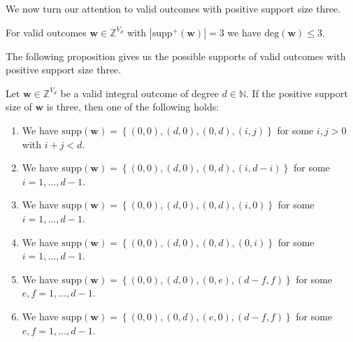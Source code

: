 We now turn our attention to valid outcomes with positive support size three.

\begin{theorem}\label{thm:sfnjksnfjkwenjfk}
    For valid outcomes \( \mathbf w \in \mathbb{Z}^{V_d}  \) with \( |\mathrm{supp}^+(\mathbf w)| = 3 \) we have \( \mathrm{deg}(\mathbf w) \leq 3 \).
\end{theorem}

The following proposition gives us the possible supports of valid outcomes with positive support size three.

\begin{proposition}\label{lemma:wmrkwjnr3w}
    Let \( \mathbf{w} \in \mathbb{Z}^{V_d} \) be a valid integral outcome of degree \( d \in \mathbb{N} \). If the positive support size of \( \mathbf{w} \) is three, then one of the following holds:
    \begin{enumerate}
        \item We have \( \mathrm{supp}(\mathbf{w}) = \left\{ (0,0), (d,0), (0,d), (i,j) \right\} \) for some \( i,j > 0 \) with \( i+j < d \).
        \item We have \( \mathrm{supp}(\mathbf{w}) = \left\{ (0,0), (d,0), (0,d), (i,d-i) \right\} \) for some \( i = 1, \dots, d-1 \).
        \item We have \( \mathrm{supp}(\mathbf{w}) = \left\{ (0,0), (d,0), (0,d), (i,0) \right\} \) for some \( i = 1, \dots, d-1 \).
        \item We have \( \mathrm{supp}(\mathbf{w}) = \left\{ (0,0), (d,0), (0,d), (0,i) \right\} \) for some \( i = 1, \dots, d-1 \).
        \item We have \( \mathrm{supp}(\mathbf{w}) = \left\{ (0,0), (d,0), (0,e), (d-f,f) \right\} \) for some \( e,f = 1 , \dots, d-1 \).
        \item We have \( \mathrm{supp}(\mathbf{w}) = \left\{ (0,0), (0,d), (e,0), (d-f,f) \right\} \) for some \( e,f = 1 , \dots, d-1 \).
    \end{enumerate}
\end{proposition}

